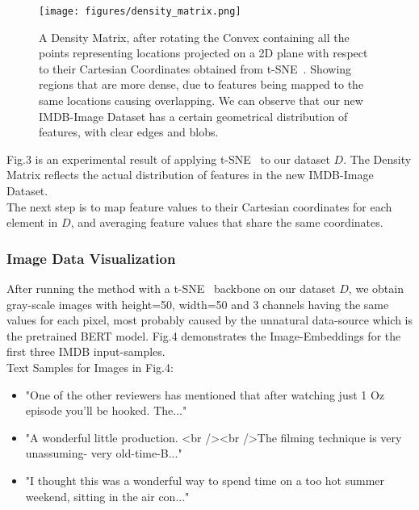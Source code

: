 \documentclass[conference]{IEEEtran}
\begin{document}
                \begin{figure}[htpb]
                \centerline{\texttt{[image: figures/density\_matrix.png]}}
                \caption{A Density Matrix, after rotating the Convex containing all the points representing locations projected on a 2D plane with respect to their Cartesian Coordinates obtained from t-SNE~\cite{tsne}. Showing regions that are more dense, due to features being mapped to the same locations causing overlapping. We can observe that our new IMDB-Image Dataset has a certain geometrical distribution of features, with clear edges and blobs.}
                \label{figure-3}
                \end{figure}
              
              
              Fig.3 is an experimental result of applying t-SNE~\cite{tsne} to our dataset $D$. The Density Matrix reflects the actual distribution of features in the new IMDB-Image Dataset. \\ The next step is to map feature values to their Cartesian coordinates for each element in $D$, and averaging feature values that share the same coordinates.\newline
                
                
\subsubsection{Image Data Visualization}
                After running the method with a t-SNE~\cite{tsne} backbone on our dataset $D$, we obtain gray-scale images with height=50, width=50 and 3 
				channels having the same values for each pixel, most probably caused by the unnatural data-source which is the pretrained BERT model.
				Fig.4 demonstrates the Image-Embeddings for the first three IMDB input-samples.\\
				Text Samples for Images in Fig.4:\\
				\begin{itemize}
				    \item "One of the other reviewers has mentioned that after watching just 1 Oz episode you'll be hooked. The..."
				    \item "A wonderful little production. <br /><br />The filming technique is very unassuming- very old-time-B..." 
				    \item "I thought this was a wonderful way to spend time on a too hot summer 
				weekend, sitting in the air con..."
				\end{itemize}
				 
\end{document}

